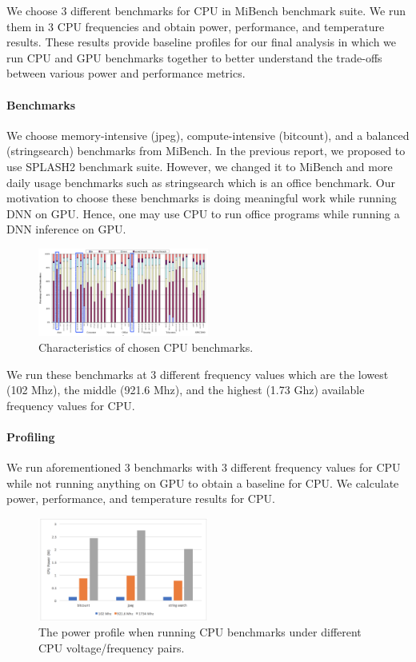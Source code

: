 We choose 3 different benchmarks for CPU in MiBench benchmark suite. We run them in 3 CPU frequencies and obtain power, performance, and temperature results. These results provide baseline profiles for our final analysis in which we run CPU and GPU benchmarks together to better understand the trade-offs between various power and performance metrics.

\paragraph{Benchmarks}


We choose memory-intensive (jpeg), compute-intensive (bitcount), and a balanced (stringsearch) benchmarks from MiBench. In the previous report, we proposed to use SPLASH2 \cite{woo1995splash} benchmark suite. However, we changed it to MiBench and more daily usage benchmarks such as stringsearch which is an office benchmark. Our motivation to choose these benchmarks is doing meaningful work while running DNN on GPU. Hence, one may use CPU to run office programs while running a DNN inference on GPU. 

\begin{figure}
  \caption{Characteristics of chosen CPU benchmarks.}
  \centering
    \includegraphics[width=0.5\textwidth]{cpubench}
\end{figure}

We run these benchmarks at 3 different frequency values which are the lowest (102 Mhz), the middle (921.6 Mhz), and the highest (1.73 Ghz) available frequency values for CPU. 

\paragraph{Profiling}


We run aforementioned 3 benchmarks with 3 different frequency values for CPU while not running anything on GPU to obtain a baseline for CPU. We calculate power, performance, and temperature results for CPU. 

\begin{figure}[h]
    \centering
    \includegraphics[width=0.5\textwidth]{cpupower.png}
    \caption{The power profile when running CPU benchmarks under different CPU voltage/frequency pairs.}\label{fig:cpupower}
\end{figure}

